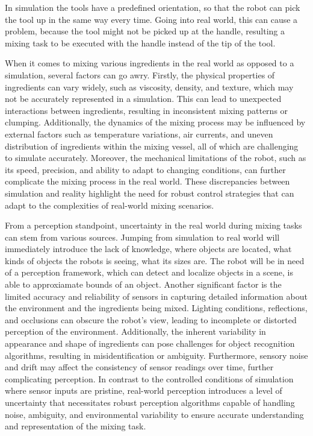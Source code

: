 In simulation the tools have a predefined orientation, so that the robot can pick the tool up in the same way every time.
Going into real world, this can cause a problem, because the tool might not be picked up at the handle, resulting
a mixing task to be executed with the handle instead of the tip of the tool.

When it comes to mixing various ingredients in the real world as opposed to a simulation, several factors can go awry. Firstly, the physical properties of ingredients can vary widely, such as viscosity, density, and texture, which may not be accurately represented in a simulation.
This can lead to unexpected interactions between ingredients, resulting in inconsistent mixing patterns or clumping. Additionally, the dynamics of the mixing process may be influenced by external factors such as temperature variations, air currents, and uneven distribution of ingredients within the mixing vessel, all of which are challenging to simulate accurately.
Moreover, the mechanical limitations of the robot, such as its speed, precision, and ability to adapt to changing conditions, can further complicate the mixing process in the real world.
These discrepancies between simulation and reality highlight the need for robust control strategies that can adapt to the complexities of real-world mixing scenarios.

From a perception standpoint, uncertainty in the real world during mixing tasks can stem from various sources.
Jumping from simulation to real world will immediately introduce the lack of knowledge, where objects are located, what kinds of objects
the robots is seeing, what its sizes are. The robot will be in need of a perception framework, which can detect and localize objects in a scene,
is able to approxiamate bounds of an object.
Another significant factor is the limited accuracy and reliability of sensors in capturing detailed information about the environment and the ingredients being mixed.
Lighting conditions, reflections, and occlusions can obscure the robot's view, leading to incomplete or distorted perception of the environment.
Additionally, the inherent variability in appearance and shape of ingredients can pose challenges for object recognition algorithms, resulting in misidentification or ambiguity.
Furthermore, sensory noise and drift may affect the consistency of sensor readings over time, further complicating perception.
In contrast to the controlled conditions of simulation where sensor inputs are pristine, real-world perception introduces a level of uncertainty that necessitates robust perception algorithms capable of handling noise, ambiguity, and environmental variability to ensure accurate understanding and representation of the mixing task.
